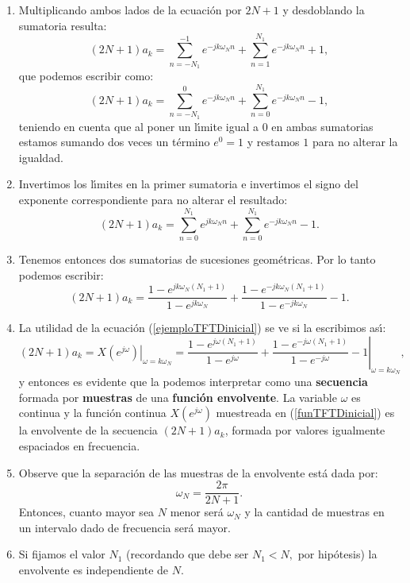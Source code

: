 \documentclass[11pt,a4paper,openany]{book}
\begin{document}
\begin{enumerate}
	\item Multiplicando ambos lados de la ecuaci\'{o}n por $2N + 1$ y desdoblando la sumatoria resulta:
	\begin{equation}
		(2N + 1) a_{k} = \sum_{n=-N_{1}}^{-1} e^{-jk\omega_{N}n} + \sum_{n=1}^{N_{1}} e^{-jk\omega_{N}n} + 1,
	\end{equation}
	que podemos escribir como:
	\begin{equation}
		(2N + 1) a_{k} = \sum_{n=-N_{1}}^{0} e^{-jk\omega_{N}n} + \sum_{n=0}^{N_{1}} e^{-jk\omega_{N}n} - 1,
	\end{equation}
	teniendo en cuenta que al poner un l\'{\i}mite igual a $0$ en ambas sumatorias estamos sumando dos veces un t\'{e}rmino $e^{0} = 1$ y restamos $1$ para no alterar la igualdad.
	
	\item Invertimos los l\'{\i}mites en la primer sumatoria e invertimos el signo del exponente correspondiente para no alterar el resultado:
	\begin{equation}
		(2N + 1) a_{k} = \sum_{n=0}^{N_{1}} e^{jk\omega_{N}n} + \sum_{n=0}^{N_{1}} e^{-jk\omega_{N}n} - 1.
	\end{equation}
	
	\item Tenemos entonces dos sumatorias de sucesiones geom\'{e}tricas. Por lo tanto podemos escribir:
	\begin{equation}
		(2N + 1) a_{k} = \frac{1 - e^{jk\omega_{N}(N_{1}+1)}}{1 - e^{jk\omega_{N}}} + \frac{1 - e^{-jk\omega_{N}(N_{1}+1)}}{1 - e^{-jk\omega_{N}}} - 1. \label{ejemploTFTDinicial}
	\end{equation}
	
	\item La utilidad de la ecuaci\'{o}n (\ref{ejemploTFTDinicial}) se ve si la escribimos as\'{\i}:
	\begin{equation}
		(2N + 1) a_{k} = \left. X(e^{j\omega}) \right|_{\omega = k\omega_{N}} =
		\left. \frac{1 - e^{j\omega(N_{1}+1)}}{1 - e^{j\omega}} + \frac{1 - e^{-j\omega(N_{1}+1)}}{1 - e^{-j\omega}} - 1 \right|_{\omega=k\omega_{N}},  \label{funTFTDinicial}
	\end{equation}
	y entonces es evidente que la podemos interpretar como una \textbf{secuencia} formada por \textbf{muestras} de una \textbf{funci\'{o}n envolvente}. La variable $\omega$ es continua y la funci\'{o}n continua $X(e^{j\omega})$ muestreada en (\ref{funTFTDinicial}) es la envolvente de la secuencia $(2N+1) a_{k}$, formada por valores igualmente espaciados en frecuencia.
	
	\item Observe que la separaci\'{o}n de las muestras de la envolvente est\'{a} dada por:
	\begin{equation}
		\omega_{N} = \frac{2\pi}{2N + 1}.
	\end{equation}
	Entonces, cuanto mayor sea $N$ menor ser\'{a} $\omega_{N}$ y la cantidad de muestras en un intervalo dado de frecuencia ser\'{a} mayor.
	
	\item Si fijamos el valor $N_{1}$ (recordando que debe ser $N_{1} < N,$ por hip\'{o}tesis) la envolvente es independiente de $N$.
\end{enumerate}
\end{document}
